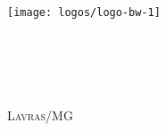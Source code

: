 
\begin{comment}
\begin{titlepage}
\maketitle
\end{titlepage} 
\end{comment}


\newpage

\begin{titlepage}
\begin{center}
\textsc{\LARGE \BookEdition}\\[2.0cm]
\texttt{[image: logos/logo-bw-1]}\\[2.0cm]
\HRule{0.4cm} \\[0.4cm]
{ \fontsize{40}{60}   \bfseries \MakeUppercase{\BookTitle}}\\[0.4cm]
\HRule{0.4cm} \\[0.7cm]
{\fontsize{25}{30} \textsc{\BookSubTitle}}\\[0.5cm]
\vfill
{\fontsize{20}{0} \textsc{\BookAuthor} }\\%

\vfill
{\fontsize{20}{0} \textsc{Lavras/MG}}\\[0.4cm]
{\fontsize{20}{0} \textsc{\BookEditionYear}}
\end{center}
\end{titlepage}

